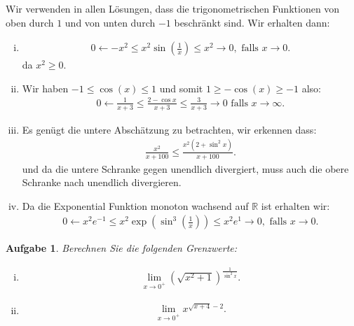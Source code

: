 \documentclass[a4paper, 20]{exam}
\newtheorem{ex}{Aufgabe}
\begin{document}
\begin{solution} Wir verwenden in allen Lösungen, dass die trigonometrischen Funktionen von oben durch $1$ und von unten durch $-1$ beschränkt sind. Wir erhalten dann:
\begin{enumerate}[i)]
\item \begin{align*}
0 \longleftarrow -x^2 \leq x^2 \sin \left( \frac{1}{x} \right) \leq x^2 \longrightarrow 0, \text{ falls } x \longrightarrow 0. 
\end{align*}
da $x^2 \geq 0$.
\item Wir haben $-1 \leq \cos (x) \leq 1$ und somit $ 1 \geq - \cos(x) \geq -1 $ also:
\begin{align*}
0 \longleftarrow \frac{1}{x+3} \leq \frac{2- \cos x}{x+3} \leq \frac{3}{x + 3} \longrightarrow 0  \text{ falls } x \longrightarrow \infty.
\end{align*}
\item Es genügt die untere Abschätzung zu betrachten, wir erkennen dass: 
\begin{align*}
\frac{x^2}{x+100} \leq \frac{x^2 (2+ \sin^2 x)}{x+100}.
\end{align*}
und da die untere Schranke gegen unendlich divergiert, muss auch die obere Schranke nach unendlich divergieren. 
\item Da die Exponential Funktion monoton wachsend auf $\mathbb{R}$ ist erhalten wir: 
\begin{align*}
0 \longleftarrow x^2 e^{-1} \leq x^2 \exp \left(  \sin^3 \left( \frac{1}{x} \right) \right) \leq x^2 e^1 \longrightarrow 0, \text{ falls } x \longrightarrow 0.
\end{align*}
\end{enumerate}
\end{solution}


\begin{ex} Berechnen Sie die folgenden Grenzwerte:
\begin{enumerate}[i)]
\item \begin{align*}
 \lim_{x \rightarrow 0^+} \left( \sqrt{x^2 +1} \right)^{ \frac{1}{\sin^2 x}} .
\end{align*}
\item \begin{align*}
\lim_{x \rightarrow 0^+} x^{ \sqrt{x+4}-2}.
\end{align*}
\end{enumerate}

\end{ex}
\end{document}
